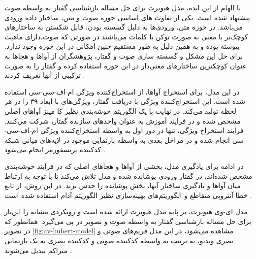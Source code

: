 با الهام از این ایده، مدل هیوبرت
برای حل مساله بازشناسی گفتار به واسطه صوت
پیشنهاد شده است. یکی از تفاوت های اساسی حوزه صوت و متن، ساختار داده ورودی می‌باشد. در حوزه متن، ورودی‌ها به دلیل گسسته بودن، قابل شکستن به ساختار‌های کوچک‌تر با معنی به صورت توکن
یا کلمات می‌باشند در صورتی که صوت،دارای ماهیت پیوسته بوده و به همین دلیل به طور مستقیم چنین امکانی در این حوزه وجود ندارد. برای حل این مشکل و گسسته سازی صوت و گفتار، پژوهشگران از آوا‌ها و هجاها به عنوان کوچکترین ساختار‌های معنی‌دار در این حوزه استفاده کرده و گفتار را به صورت ترکیبی از آنها تعریف کردند
\cite{DBLP:journals/corr/abs-2106-07447}
. 

در این مدل، برای استخراج آوا‌ها، از استخراج‌کننده ویژگی
ام-اف-سی-سی
استفاده شده است. این استخراج‌کننده ویژگی با دریافت گفتار، ویژگی‌های با ابعاد ۳۹ را در هر لحظه تولید می‌کند. در نهایت با یک الگوریتم خوشه‌بندی نظیر کا-مینز
آواهای اصلی مشخص شده و در فرایند آموزش به عنوان واحد‌های سازنده گفتار، شرکت می‌کنند. فرایند استخراج ویژگی، تنها در دور
اول به واسطه استخراج‌کننده ویژگی ام-اف-سی-سی انجام شده و در مراحل بعدی به واسطه بازنمایی موجود در لایه‌های میانی شبکه کد‌کننده
ترنسفورمر انجام می‌شود
\cite{DBLP:journals/corr/abs-2106-07447}
.

در ادامه برای یادگیری مدل، بخشی از آواها و هجاهای اصلی که در فرایند خوشه‌بندی مشخص شده‌اند، در گفتار ورودی پوشانده شده و مدل تلاش می‌کند تا با توجه به ارتباط میان آواها و یادگیری ساختار آنها، بخش پوشانده را حدس بزند. در این روش، از تابع خطا آنتروپی متقاطع
و الگوریتم‌های بهینه‌سازی نظیر الگوریتم آدام
استفاده شده است
\cite{DBLP:journals/corr/abs-2106-07447}
.

مدل ای-وی هیوبرت، بر پایه مدل هیوبرت ارائه شده است و رویکردی مشابه را این‌بار برای حل مساله بازشناسی گفتار به واسطه صوت و تصویر در پی می‌گیرد. همانطور که در تصویر 
\ref{fig:av-hubert-model}
مشاهده می‌شود، در این مدل فریم‌های صوتی و بصری ویدیو، به ترتیب به واسطه کدکننده صوتی و کدکننده بصری به یک بازنمایی متراکم
تبدیل می‌شوند
\cite{shi2022robust}
.

